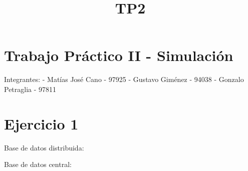\documentclass[11pt]{article}
\title{TP2}
\begin{document}
    
    
    \maketitle
    
    

    
    \section{Trabajo Práctico II -
Simulación}\label{trabajo-pruxe1ctico-ii---simulaciuxf3n}

Integrantes: - Matías José Cano - 97925 - Gustavo Giménez - 94038 -
Gonzalo Petraglia - 97811

    \section{Ejercicio 1}\label{ejercicio-1}

Base de datos distribuida:

Base de datos central:
\end{document}
